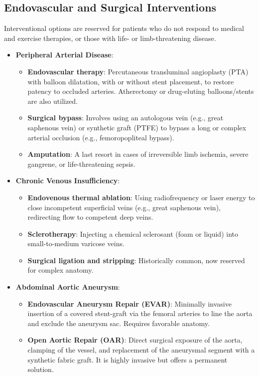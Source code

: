 \subsection*{Endovascular and Surgical Interventions}
Interventional options are reserved for patients who do not respond to medical and exercise therapies, or those with life- or limb-threatening disease.
\begin{itemize}
    \item \textbf{Peripheral Arterial Disease}:
    \begin{itemize}
        \item \textbf{Endovascular therapy}: Percutaneous transluminal angioplasty (PTA) with balloon dilatation, with or without stent placement, to restore patency to occluded arteries. Atherectomy or drug-eluting balloons/stents are also utilized.
        \item \textbf{Surgical bypass}: Involves using an autologous vein (e.g., great saphenous vein) or synthetic graft (PTFE) to bypass a long or complex arterial occlusion (e.g., femoropopliteal bypass).
        \item \textbf{Amputation}: A last resort in cases of irreversible limb ischemia, severe gangrene, or life-threatening sepsis.
    \end{itemize}
    \item \textbf{Chronic Venous Insufficiency}:
    \begin{itemize}
        \item \textbf{Endovenous thermal ablation}: Using radiofrequency or laser energy to close incompetent superficial veins (e.g., great saphenous vein), redirecting flow to competent deep veins.
        \item \textbf{Sclerotherapy}: Injecting a chemical sclerosant (foam or liquid) into small-to-medium varicose veins.
        \item \textbf{Surgical ligation and stripping}: Historically common, now reserved for complex anatomy.
    \end{itemize}
    \item \textbf{Abdominal Aortic Aneurysm}:
    \begin{itemize}
        \item \textbf{Endovascular Aneurysm Repair (EVAR)}: Minimally invasive insertion of a covered stent-graft via the femoral arteries to line the aorta and exclude the aneurysm sac. Requires favorable anatomy.
        \item \textbf{Open Aortic Repair (OAR)}: Direct surgical exposure of the aorta, clamping of the vessel, and replacement of the aneurysmal segment with a synthetic fabric graft. It is highly invasive but offers a permanent solution.
    \end{itemize}
\end{itemize}

